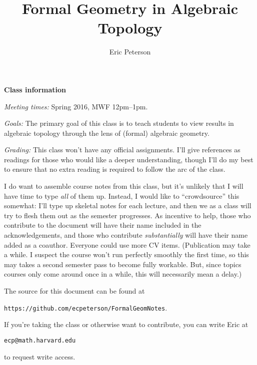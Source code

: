 \documentclass[12pt]{book}
\title{Formal Geometry in Algebraic Topology}
\author{Eric Peterson}
\newcommand{\<}{\langle}
\renewcommand{\>}{\rangle}
\numberwithin{equation}{section}
\theoremstyle{plain}
\theoremstyle{definition}
\theoremstyle{remark}
\begin{document}
\frontmatter

\maketitle

\textbf{Class information}

\vspace{2\baselineskip} \noindent \textit{Meeting times: }
Spring 2016, MWF 12pm--1pm.

\vspace{2\baselineskip} \noindent \textit{Goals: }
The primary goal of this class is to teach students to view results in algebraic topology through the lens of (formal) algebraic geometry.

\vspace{2\baselineskip} \noindent \textit{Grading: }
This class won't have any official assignments. I'll give references as readings for those who would like a deeper understanding, though I'll do my best to ensure that no extra reading is required to follow the arc of the class.

I do want to assemble course notes from this class, but it's unlikely that I will have time to type \emph{all} of them up. Instead, I would like to ``crowdsource'' this somewhat: I'll type up skeletal notes for each lecture, and then we as a class will try to flesh them out as the semester progresses. As incentive to help, those who contribute to the document will have their name included in the acknowledgements, and those who contribute \emph{substantially} will have their name added as a coauthor. Everyone could use more CV items. (Publication may take a while. I suspect the course won't run perfectly smoothly the first time, so this may takes a second semester pass to become fully workable. But, since topics courses only come around once in a while, this will necessarily mean a delay.)

The source for this document can be found at
\begin{center}
\texttt{https://github.com/ecpeterson/FormalGeomNotes}.
\end{center}
If you're taking the class or otherwise want to contribute, you can write Eric at
\begin{center}
\texttt{ecp@math.harvard.edu}
\end{center}
to request write access.



\newpage

\tableofcontents
\end{document}
